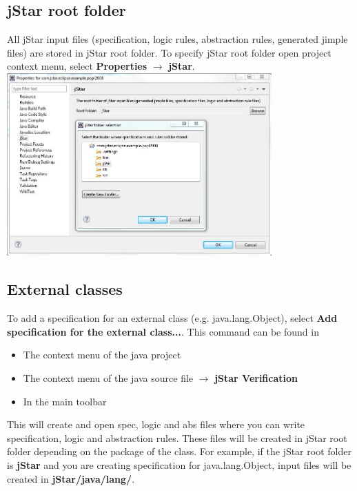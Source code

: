 \documentclass{article}
\begin{document}
\subsection{jStar root folder}
\label{sec:jstarrootfolder}

All jStar input files (specification, logic rules, abstraction rules, generated jimple files) are stored in jStar root folder. To specify jStar root folder open project context menu, select {\bf Properties} $\rightarrow$ {\bf jStar}.\\

\includegraphics[width=4in]{images/rootFolder.jpg}

\subsection{External classes}
\label{sec:externalclasses}

To add a specification for an external class (e.g. java.lang.Object), select {\bf Add specification for the external class...}. This command can be found in 
\begin{itemize}
\item The context menu of the java project
\item The context menu of the java source file $\rightarrow$ {\bf jStar Verification} 
\item In the main toolbar

\end{itemize}
This will create and open spec, logic and abs files where you can write specification, logic and abstraction rules. These files will be created in jStar root folder depending on the package of the class. For example, if the jStar root folder is {\bf jStar} and you are creating specification for java.lang.Object, input files will be created in {\bf jStar/java/lang/}.
\end{document}
